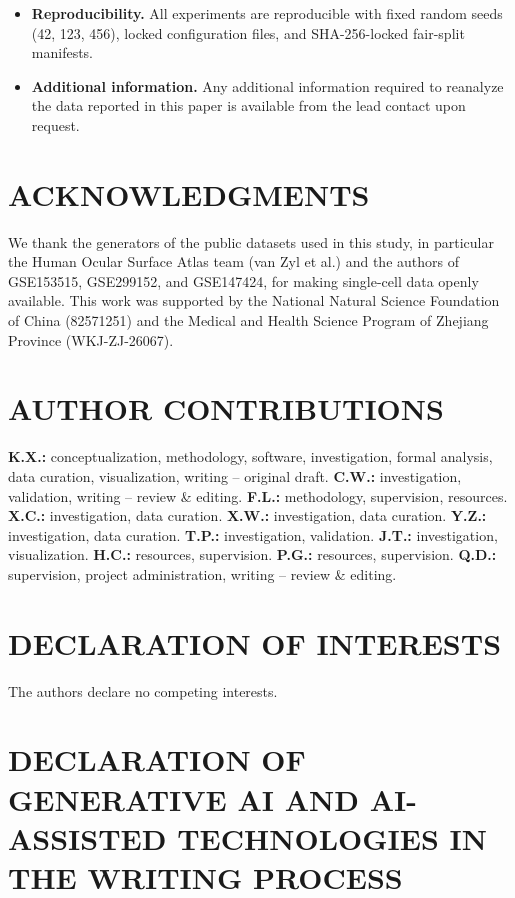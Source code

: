 \documentclass[12pt,letterpaper]{article}
\begin{document}
\begin{itemize}
\item \textbf{Reproducibility.} All experiments are reproducible with fixed random seeds (42, 123, 456), locked configuration files, and SHA-256-locked fair-split manifests.
\item \textbf{Additional information.} Any additional information required to reanalyze the data reported in this paper is available from the lead contact upon request.
\end{itemize}

\section*{ACKNOWLEDGMENTS}

We thank the generators of the public datasets used in this study, in particular the Human Ocular Surface Atlas team (van Zyl et al.) and the authors of GSE153515, GSE299152, and GSE147424, for making single-cell data openly available. This work was supported by the National Natural Science Foundation of China (82571251) and the Medical and Health Science Program of Zhejiang Province (WKJ-ZJ-26067).

\section*{AUTHOR CONTRIBUTIONS}

\textbf{K.X.:} conceptualization, methodology, software, investigation, formal analysis, data curation, visualization, writing -- original draft. \textbf{C.W.:} investigation, validation, writing -- review \& editing. \textbf{F.L.:} methodology, supervision, resources. \textbf{X.C.:} investigation, data curation. \textbf{X.W.:} investigation, data curation. \textbf{Y.Z.:} investigation, data curation. \textbf{T.P.:} investigation, validation. \textbf{J.T.:} investigation, visualization. \textbf{H.C.:} resources, supervision. \textbf{P.G.:} resources, supervision. \textbf{Q.D.:} supervision, project administration, writing -- review \& editing.

\section*{DECLARATION OF INTERESTS}

The authors declare no competing interests.

\section*{DECLARATION OF GENERATIVE AI AND AI-ASSISTED TECHNOLOGIES IN THE WRITING PROCESS}
\end{document}
